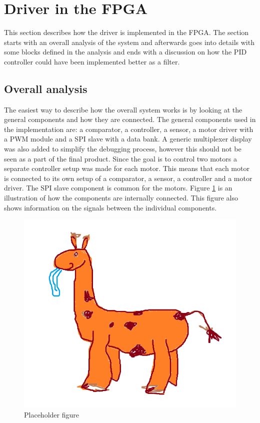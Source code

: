 \section{Driver in the FPGA}
This section describes how the driver is implemented in the FPGA. The section starts with an overall analysis of the system and afterwards goes into details with some blocks defined in the analysis and ends with a discussion on how the PID controller could have been implemented better as a filter.

\subsection{Overall analysis}

The easiest way to describe how the overall system works is by looking at the general components and how they are connected. The general components used in the implementation are: a comparator, a controller, a sensor, a motor driver with a PWM module and a SPI slave with a data bank. A generic multiplexer display was also added to simplify the debugging process, however this should not be seen as a part of the final product.
Since the goal is to control two motors a separate controller setup was made for each motor. This means that each motor is connected to its own setup of a comparator, a sensor, a controller and a motor driver. The SPI slave component is common for the motors.
Figure \ref{fig:IDEA_WEIGHT_v2} is an illustration of how the components are internally connected. This figure also shows information on the signals between the individual components.

\newpage
\begin{figure}[h!]
\centering
\includegraphics[scale=0.5]{billeder/IDEA_WEIGHT_v2.png}
\caption{ Placeholder figure }
\label{fig:IDEA_WEIGHT_v2}
\end{figure}
\newpage

